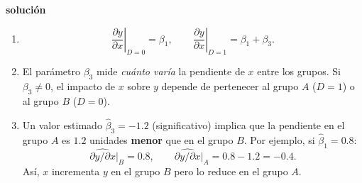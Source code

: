 \documentclass[10pt,a4paper]{article}
\begin{document}
\begin{enumerate}
\textbf{solución}
\begin{enumerate}
  \item[(a)] 
    \[
      \left.\frac{\partial y}{\partial x}\right|_{D=0} = \beta_1, 
      \qquad
      \left.\frac{\partial y}{\partial x}\right|_{D=1} = \beta_1 + \beta_3.
    \]
  \item[(b)] El parámetro $\beta_3$ mide \emph{cuánto varía} la pendiente de $x$ entre los grupos.  
        Si $\beta_3 \neq 0$, el impacto de $x$ sobre $y$ depende de pertenecer al grupo $A$ ($D=1$) o al grupo $B$ ($D=0$).
  \item[(c)] Un valor estimado $\widehat{\beta}_3=-1.2$ (significativo) implica que la pendiente en el grupo $A$ es $1.2$ unidades \textbf{menor} que en el grupo $B$.  
        Por ejemplo, si $\widehat{\beta}_1 = 0.8$:
        \[
          \widehat{\partial y/\partial x}\big|_{B} = 0.8, 
          \qquad
          \widehat{\partial y/\partial x}\big|_{A} = 0.8 - 1.2 = -0.4.
        \]
        Así, \(x\) incrementa \(y\) en el grupo \(B\) pero lo reduce en el grupo \(A\).
\end{enumerate}

\end{enumerate}




    
\end{document}
